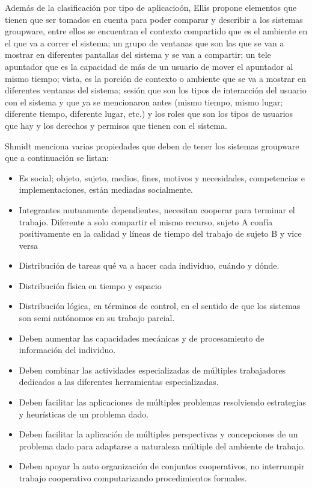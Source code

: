 Adem\'as de la clasificaci\'on por tipo de aplicacio\'on, Ellis\citep{ellis1991groupware} propone elementos que tienen que ser tomados en cuenta para poder comparar y describir a los sistemas groupware, entre ellos se encuentran el contexto compartido que es el ambiente en el que va a correr el sistema; un grupo de ventanas que son las que se van a mostrar en diferentes pantallas del sistema y se van a compartir; un tele apuntador que es la capacidad de m\'as de un usuario de mover el apuntador al mismo tiempo; vista, es la porci\'on de contexto o ambiente que se va a mostrar en diferentes ventanas del sistema; sesi\'on que son los tipos de interacci\'on del usuario con el sistema y que ya se mencionaron antes (mismo tiempo, mismo lugar; diferente tiempo, diferente lugar, etc.) y los roles que son los tipos de usuarios que hay y los derechos y permisos que tienen con el sistema.

Shmidt \citep{schmidt1992taking} menciona varias propiedades que deben de tener los sistemas groupware que a continuaci\'on se listan:
\begin{itemize}
\item Es social; objeto, sujeto, medios, fines, motivos y necesidades, competencias e implementaciones, est\'an mediadas socialmente.
\item Integrantes mutuamente dependientes, necesitan cooperar para terminar el trabajo. Diferente a solo compartir el mismo recurso, sujeto A conf\'ia positivamente en la calidad y l\'ineas de tiempo del trabajo de sujeto B y vice versa
\item Distribuci\'on de tareas qu\'e va a hacer cada individuo, cu\'ando y d\'onde.
\item Distribuci\'on f\'isica en tiempo y espacio
\item Distribuci\'on l\'ogica, en t\'erminos de control, en el sentido de que los sistemas son semi aut\'onomos en su trabajo parcial.
\item Deben aumentar las capacidades mec\'anicas y de procesamiento de informaci\'on del individuo.
\item Deben combinar las actividades especializadas de m\'ultiples trabajadores dedicados a las diferentes herramientas especializadas.
\item Deben facilitar las aplicaciones de m\'ultiples problemas resolviendo estrategias y heur\'isticas de un problema dado.
\item Deben facilitar la aplicaci\'on de m\'ultiples perspectivas y concepciones de un problema dado para adaptarse a naturaleza m\'ultiple del ambiente de trabajo.
\item Deben apoyar la auto organizaci\'on de conjuntos cooperativos, no interrumpir trabajo cooperativo computarizando procedimientos formales.
\end{itemize}

